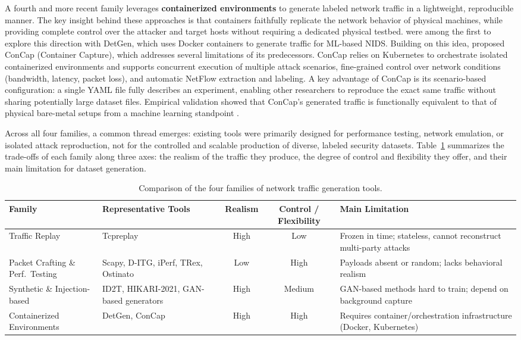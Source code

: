\documentclass[conference]{IEEEtran}
\begin{document}
A fourth and more recent family leverages \textbf{containerized
environments} to generate labeled network traffic in a lightweight,
reproducible manner. The key insight behind these approaches is that
containers faithfully replicate the network behavior of physical
machines, while providing complete control over the attacker and target
hosts without requiring a dedicated physical testbed. \textcite{detgen2021}
were among the first to explore this direction with DetGen, which uses
Docker containers to generate traffic for ML-based NIDS. Building on
this idea, \textcite{concap2026} proposed ConCap (Container Capture),
which addresses several limitations of its predecessors. ConCap relies
on Kubernetes to orchestrate isolated containerized environments and
supports concurrent execution of multiple attack scenarios, fine-grained
control over network conditions (bandwidth, latency, packet loss), and
automatic NetFlow extraction and labeling. A key advantage of ConCap
is its scenario-based configuration: a single YAML file fully describes
an experiment, enabling other researchers to reproduce the exact same
traffic without sharing potentially large dataset files. Empirical
validation showed that ConCap's generated traffic is functionally
equivalent to that of physical bare-metal setups from a machine
learning standpoint \cite{concap2026}.

Across all four families, a common thread emerges: existing tools
were primarily designed for performance testing, network emulation,
or isolated attack reproduction, not for the controlled and scalable
production of diverse, labeled security datasets. Table~\ref{tab:tools}
summarizes the trade-offs of each family along three axes: the
realism of the traffic they produce, the degree of control and
flexibility they offer, and their main limitation for dataset
generation.

\begin{table}[!t]
  \centering
  \caption{Comparison of the four families of network traffic
           generation tools.}
  \label{tab:tools}
  \begin{tabular}{lp{3.2cm}ccp{5.6cm}}
    \toprule
    \textbf{Family} & \textbf{Representative Tools} & \textbf{Realism} &
    \textbf{Control / Flexibility} & \textbf{Main Limitation} \\
    \midrule
    Traffic Replay &
      Tcpreplay &
      High &
      Low &
      Frozen in time; stateless, cannot reconstruct multi-party attacks \\
    Packet Crafting \& Perf.\ Testing &
      Scapy, D-ITG, iPerf, TRex, Ostinato &
      Low &
      High &
      Payloads absent or random; lacks behavioral realism \\
    Synthetic \& Injection-based &
      ID2T, HIKARI-2021, GAN-based generators &
      High &
      Medium &
      GAN-based methods hard to train; depend on background capture \\
    Containerized Environments &
      DetGen, ConCap &
      High &
      High &
      Requires container/orchestration infrastructure (Docker, Kubernetes) \\
    \bottomrule
  \end{tabular}
\end{table}
\end{document}
